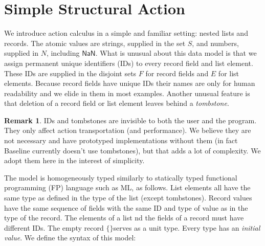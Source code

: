 \documentclass[english,submission]{programming}
\theoremstyle{definition}
\newtheorem*{remark}{Remark}
\newcommand{\mathbox}[1]{\colorbox{black!10}{$#1$}}
\begin{document}
\section{Simple Structural Action}

We introduce action calculus in a simple and familiar setting: nested lists and records. The atomic values are strings, supplied in the set \mathbox{S}, and numbers, supplied in \mathbox{N}, including \mathbox{\textsf{NaN}}. What is unusual about this data model is that we assign permanent unique identifiers (IDs) to every record field and list element. These IDs are supplied in the disjoint sets \mathbox{F} for record fields and \mathbox{E} for list elements. Because record fields have unique IDs their names are only for human readability and we elide in them in most examples. Another unusual feature is that deletion of a record field or list element leaves behind a \textit{tombstone}.

\begin{remark}
IDs and tombstones are invisible to both the user and the program. They only affect action transportation (and performance). We believe they are not necessary and have prototyped implementations without them (in fact Baseline currently doesn't use tombstones), but that adds a lot of complexity. We adopt them here in the interest of simplicity.
\end{remark}

The model is homogeneously typed similarly to statically typed functional programming (FP) language such as ML, as follows. List elements all have the same type as defined in the type of the list (except tombstones). Record values have the same sequence of fields with the same ID and type of value as in the type of the record. The elements of a list nd the fields of a record must have different IDs.
The empty record \mathbox{\text{\{\}}}serves as a unit type. Every type has an \textit{initial value}. We define the syntax of this model:
\end{document}
